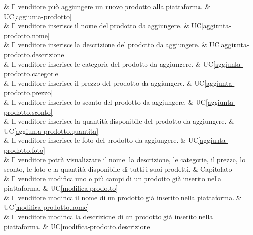  & Il venditore può aggiungere un nuovo prodotto alla piattaforma. & UC\ref{aggiunta-prodotto} \\
	
 & Il venditore inserisce il nome del prodotto da aggiungere. & UC\ref{aggiunta-prodotto.nome} \\
	
 & Il venditore inserisce la descrizione del prodotto da aggiungere. & UC\ref{aggiunta-prodotto.descrizione} \\
	
 & Il venditore inserisce le categorie del prodotto da aggiungere. & UC\ref{aggiunta-prodotto.categorie} \\
	
 & Il venditore inserisce il prezzo del prodotto da aggiungere. & UC\ref{aggiunta-prodotto.prezzo} \\
	
 & Il venditore inserisce lo sconto del prodotto da aggiungere. & UC\ref{aggiunta-prodotto.sconto} \\
	
 & Il venditore inserisce la quantità disponibile del prodotto da aggiungere. & UC\ref{aggiunta-prodotto.quantita} \\
	
 & Il venditore inserisce le foto del prodotto da aggiungere. & UC\ref{aggiunta-prodotto.foto} \\
	
 & Il venditore potrà visualizzare il nome, la descrizione, le categorie, il prezzo, lo sconto, le foto e la quantità disponibile di tutti i suoi prodotti. & Capitolato \\
    
 & Il venditore modifica uno o più campi di un prodotto già inserito nella piattaforma. & UC\ref{modifica-prodotto} \\
    
 & Il venditore modifica il nome di un prodotto già inserito nella piattaforma. & UC\ref{modifica-prodotto.nome} \\
    
 & Il venditore modifica la descrizione di un prodotto già inserito nella piattaforma. & UC\ref{modifica-prodotto.descrizione} \\
    
